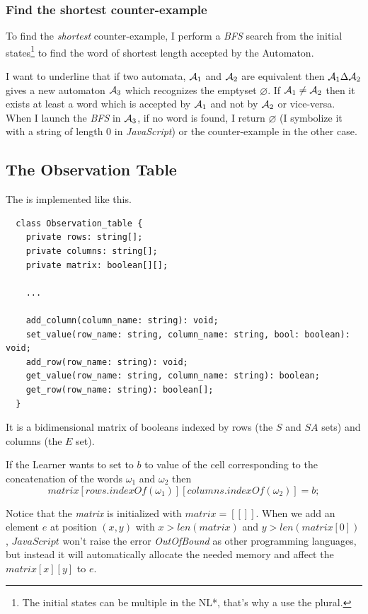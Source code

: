 \subsubsection{Find the shortest counter-example}
To find the \textit{shortest} counter-example, I perform a \textit{BFS} search from the initial states\footnote{The initial states can be multiple in the NL*, that's why a use the plural.} to find the word of shortest length accepted by the Automaton.

I want to underline that if two automata, $\mathcal{A}_1$ and $\mathcal{A}_2$ are equivalent then $\mathcal{A}_1 \Delta \mathcal{A}_2$ gives a new automaton $\mathcal{A}_3$ which recognizes the emptyset $\varnothing$. If $\mathcal{\mathcal{A}}_1 \neq \mathcal{\mathcal{A}}_2$ then it exists at least a word which is accepted by $\mathcal{A}_1$ and not by $\mathcal{A}_2$ or vice-versa. When I launch the \textit{BFS} in $\mathcal{A}_3$, if no word is found, I return $\varnothing$ (I symbolize it with a string of length 0 in \textit{JavaScript}) or the counter-example in the other case.

\subsection{The Observation Table}
The \OT is implemented like this.

\begin{verbatim}
  class Observation_table {
    private rows: string[];
    private columns: string[];
    private matrix: boolean[][];

    ...
  
    add_column(column_name: string): void;
    set_value(row_name: string, column_name: string, bool: boolean): void;
    add_row(row_name: string): void;
    get_value(row_name: string, column_name: string): boolean;
    get_row(row_name: string): boolean[];
  }
  \end{verbatim}

It is a bidimensional matrix of booleans indexed by rows (the $S$ and $SA$ sets) and columns (the $E$ set).

If the Learner wants to set to $b$ to value of the cell corresponding to the concatenation of the words $\omega_1$ and $\omega_2$ then
\[matrix[rows.indexOf(\omega_1)][columns.indexOf(\omega_2)] = b;\]

Notice that the \textit{matrix} is initialized with $matrix = [[]]$. When we add an element $e$ at position $(x, y)$ with $x > len(matrix)$ and $y > len(matrix[0])$, $JavaScript$ won't raise the error \textit{OutOfBound} as other programming languages, but instead it will automatically allocate the needed memory and affect the $matrix[x][y]$ to $e$.

